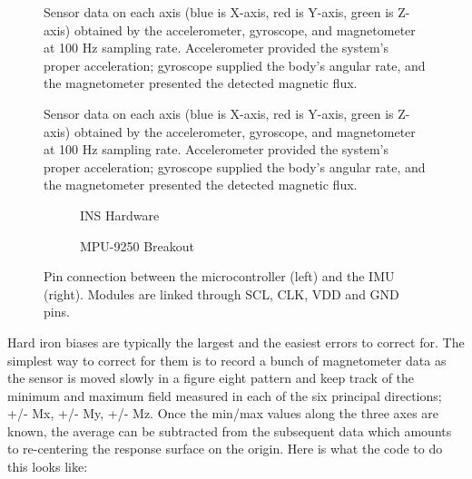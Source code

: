 \begin{figure}[!h]
    \centering
    \resizebox{1\linewidth}{!}{}
    \caption{Sensor data on each axis (blue is X-axis, red is Y-axis, green is Z-axis) obtained by the accelerometer, gyroscope, and magnetometer at 100 Hz sampling rate. Accelerometer provided the system’s proper acceleration; gyroscope supplied the body’s angular rate, and the magnetometer presented the detected magnetic flux.}
\end{figure}

\begin{figure}[!h]
    \centering
    \resizebox{1\linewidth}{!}{}
    \caption{Sensor data on each axis (blue is X-axis, red is Y-axis, green is Z-axis) obtained by the accelerometer, gyroscope, and magnetometer at 100 Hz sampling rate. Accelerometer provided the system’s proper acceleration; gyroscope supplied the body’s angular rate, and the magnetometer presented the detected magnetic flux.}
\end{figure}

\begin{figure}[!h]
    \centering
    \begin{subfigure}{0.49\textwidth}
        \centering
        \resizebox{1\linewidth}{!}{}
        \caption{INS Hardware}
        \label{fig:sub1}
    \end{subfigure}%
    \begin{subfigure}{0.49\textwidth}
        \centering
        \resizebox{1\linewidth}{!}{}
        \caption{MPU-9250 Breakout}
        \label{fig:sub2}
    \end{subfigure}
    \caption{Pin connection between the microcontroller (left) and the IMU (right). Modules are linked through SCL, CLK, VDD and GND pins.}
    \label{fig:hardware}
\end{figure}
Hard iron biases are typically the largest and the easiest errors to correct for. The simplest way to correct for them is to record a bunch of magnetometer data as the sensor is moved slowly in a figure eight pattern and keep track of the minimum and maximum field measured in each of the six principal directions; +/- Mx, +/- My, +/- Mz. Once the min/max values along the three axes are known, the average can be subtracted from the subsequent data which amounts to re-centering the response surface on the origin. Here is what the code to do this looks like:

